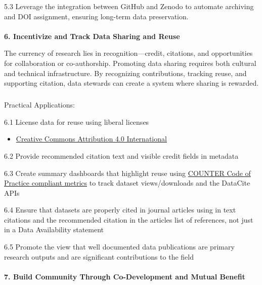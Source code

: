 \documentclass[
  letterpaper,
  DIV=11,
  numbers=noendperiod]{scrartcl}
\makeatletter
\let\oldparagraph\paragraph
\renewcommand{\paragraph}{
    \@ifstar
      \xxxParagraphStar
      \xxxParagraphNoStar
  }
\newcommand{\xxxParagraphStar}[1]{\oldparagraph*{#1}\mbox{}}
\newcommand{\xxxParagraphNoStar}[1]{\oldparagraph{#1}\mbox{}}
\let\oldsubparagraph\subparagraph
\renewcommand{\subparagraph}{
    \@ifstar
      \xxxSubParagraphStar
      \xxxSubParagraphNoStar
  }
\newcommand{\xxxSubParagraphStar}[1]{\oldsubparagraph*{#1}\mbox{}}
\newcommand{\xxxSubParagraphNoStar}[1]{\oldsubparagraph{#1}\mbox{}}
\providecommand{\tightlist}{%
  \setlength{\itemsep}{0pt}\setlength{\parskip}{0pt}}\usepackage{longtable,booktabs,array}
\makeatother
\begin{document}
5.3 Leverage the integration between GitHub and Zenodo to automate
archiving and DOI assignment, ensuring long-term data preservation.

\paragraph{\texorpdfstring{\textbf{6. Incentivize and Track Data Sharing
and
Reuse}}{6. Incentivize and Track Data Sharing and Reuse}}\label{incentivize-and-track-data-sharing-and-reuse}

The currency of research lies in recognition---credit, citations, and
opportunities for collaboration or co-authorship. Promoting data sharing
requires both cultural and technical infrastructure. By recognizing
contributions, tracking reuse, and supporting citation, data stewards
can create a system where sharing is rewarded.

\subparagraph{Practical Applications:}\label{practical-applications-5}

6.1 License data for reuse using liberal licenses

\begin{itemize}
\tightlist
\item
  \href{https://creativecommons.org/licenses/by/4.0/deed.en}{Creative
  Commons Attribution 4.0 International}
\end{itemize}

6.2 Provide recommended citation text and visible credit fields in
metadata

6.3 Create summary dashboards that highlight reuse using
\href{https://www.countermetrics.org/}{COUNTER Code of Practice
compliant metrics} to track dataset views/downloads and the DataCite
APIs

6.4 Ensure that datasets are properly cited in journal articles using in
text citations and the recommended citation in the articles list of
references, not just in a Data Availability statement

6.5 Promote the view that well documented data publications are primary
research outputs and are significant contributions to the field

\paragraph{\texorpdfstring{\textbf{7. Build Community Through
Co-Development and Mutual
Benefit}}{7. Build Community Through Co-Development and Mutual Benefit}}\label{build-community-through-co-development-and-mutual-benefit}
\end{document}
